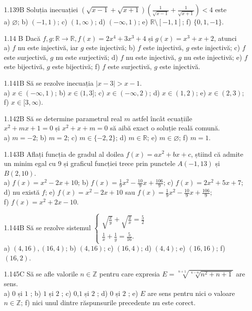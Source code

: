 \documentclass[11pt]{article}
\begin{document}
1.139B Soluția inecuației $(\sqrt{x-1}+\sqrt{x+1})\left(\frac{1}{\sqrt{x-1}}+\frac{1}{\sqrt{x+1}}\right)<4$ este\\ a) $\varnothing$; b) $(-1,1)$; c) $(1, \infty)$; d) $(-\infty, 1)$; e) $\mathbb{R} \setminus[-1,1]$; f) $\{0,1,-1\}$.

1.14 B Dacă $f, g: \mathbb{R} \rightarrow \mathbb{R}, f(x)=2 x^{4}+3 x^{3}+4$ și $g(x)=x^{3}+x+2$, atunci\\ a) $f$ nu este injectivă, iar $g$ este injectivă; b) $f$ este injectivă, $g$ este injectivă; c) $f$ este surjectivă, $g$ nu este surjectivă; d) $f$ nu este injectivă, $g$ nu este injectivă; e) $f$ este bijectivă, $g$ este bijectivă; f) $f$ este surjectivă, $g$ este injectivă.

1.141B Să se rezolve inecuația $|x-3|>x-1$.\\ a) $x \in(-\infty, 1)$; b) $x \in(1,3]$; c) $x \in(-\infty, 2)$; d) $x \in(1,2)$; e) $x \in(2,3)$;\\ f) $x \in[3, \infty)$.

1.142B Să se determine parametrul real $m$ astfel încât ecuațiile\\ $x^{2}+m x+1=0$ și $x^{2}+x+m=0$ să aibă exact o soluție reală comună.\\ a) $m=-2$; b) $m=2$; c) $m \in\{-2,2\}$; d) $m \in \mathbb{R}$; e) $m \in \varnothing$; f) $m=1$.

1.143B Aflați funcția de gradul al doilea $f(x)=a x^{2}+b x+c$, știind că admite un minim egal cu 9 și graficul funcției trece prin punctele $A(-1,13)$ și $B(2,10)$.\\ a) $f(x)=x^{2}-2 x+10$; b) $f(x)=\frac{1}{9} x^{2}-\frac{10}{9} x+\frac{106}{9}$; c) $f(x)=2 x^{2}+5 x+7$; d) nu există $f$; e) $f(x)=x^{2}-2 x+10$ sau $f(x)=\frac{1}{9} x^{2}-\frac{10}{9} x+\frac{106}{9}$;\\ f) $f(x)=x^{2}+2 x-10$.

1.144B Să se rezolve sistemul $\left\{\begin{array}{l}\sqrt{\frac{x}{y}}+\sqrt{\frac{y}{x}}=\frac{5}{2} \\ \frac{1}{x}+\frac{1}{y}=\frac{5}{16}.\end{array}\right.$\\ a) $(4,16),(16,4)$; b) $(4,16)$; c) $(16,4)$; d) $(4,4)$; e) $(16,16)$; f) $(16,2)$.

1.145C Să se afle valorile $n \in \mathbb{Z}$ pentru care expresia $E = \sqrt[n+1]{\sqrt[4-n]{n^{2}+n+1}}$ are sens.\\ a) $0$ și $1$ ; b) $1$ și $2$ ; c) $0$,$1$ și $2$ ; d) $0$ și $2$ ; e) $E$ are sens pentru nici o valoare $n \in \mathbb{Z}$; f) nici unul dintre răspunsurile precedente nu este corect.
\end{document}
